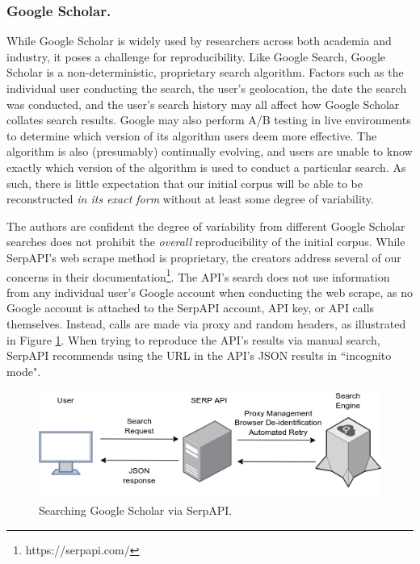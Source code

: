 \documentclass[manuscript,screen,review]{acmart}
\begin{document}
\subsubsection{Google Scholar.} While Google Scholar is widely used by researchers across both academia and industry, it poses a challenge for reproducibility. Like Google Search, Google Scholar is a non-deterministic, proprietary search algorithm. Factors such as the individual user conducting the search, the user's geolocation, the date the search was conducted, and the user's search history may all affect how Google Scholar collates search results. Google may also perform A/B testing in live environments to determine which version of its algorithm users deem more effective. The algorithm is also (presumably) continually evolving, and users are unable to know exactly which version of the algorithm is used to conduct a particular search. As such, there is little expectation that our initial corpus will be able to be reconstructed \textit{in its exact form} without at least some degree of variability.

The authors are confident the degree of variability from different Google Scholar searches does not prohibit the \textit{overall} reproducibility of the initial corpus. While SerpAPI's web scrape method is proprietary, the creators address several of our concerns in their documentation\footnote{https://serpapi.com/}. The API's search does not use information from any individual user's Google account when conducting the web scrape, as no Google account is attached to the SerpAPI account, API key, or API calls themselves. Instead, calls are made via proxy and random headers, as illustrated in Figure \ref{fig:serpAPI}. When trying to reproduce the API's results via manual search, SerpAPI recommends using the URL in the API's JSON results in ``incognito mode". 

\begin{figure}
    \includegraphics[width=\textwidth]{img/SERP_API_diagram.drawio.png}
    \caption{Searching Google Scholar via SerpAPI.}
    \label{fig:serpAPI}
\end{figure}
\end{document}
